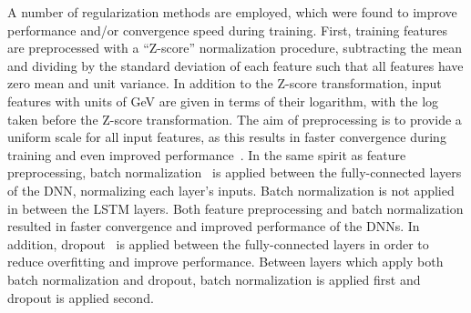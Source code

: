 A number of regularization methods are employed, which were found to improve performance and/or convergence speed during training.
First, training features are preprocessed with a ``Z-score'' normalization procedure, subtracting the mean and dividing by the standard deviation of each feature such that all features have zero mean and unit variance.
In addition to the Z-score transformation, input features with units of GeV are given in terms of their logarithm, with the log taken before the Z-score transformation.
The aim of preprocessing is to provide a uniform scale for all input features, as this results in faster convergence during training and even improved performance~\cite{lecun_efficient_backprop}.
In the same spirit as feature preprocessing, batch normalization~\cite{ioffe2015batch} is applied between the fully-connected layers of the DNN, normalizing each layer's inputs.
Batch normalization is not applied in between the LSTM layers.
Both feature preprocessing and batch normalization resulted in faster convergence and improved performance of the DNNs.
In addition, dropout~\cite{dropout} is applied between the fully-connected layers in order to reduce overfitting and improve performance.
Between layers which apply both batch normalization and dropout, batch normalization is applied first and dropout is applied second.


